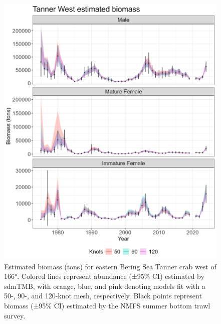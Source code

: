 \documentclass[
]{article}
\begin{document}
\begin{figure}

{\centering \includegraphics[width=1\linewidth,height=1\textheight]{../BAIRDI/Figures/TannerWest.biomass.index} 

}

\caption{Estimated biomass (tons) for eastern Bering Sea Tanner crab west of 166°. Colored lines represent abundance (±95\% CI) estimated by sdmTMB, with orange, blue, and pink denoting models fit with a 50-, 90-, and 120-knot mesh, respectively. Black points represent biomass (±95\% CI) estimated by the NMFS summer bottom trawl survey.}\label{fig:Westbairdi-bio-index}
\end{figure}
\end{document}
